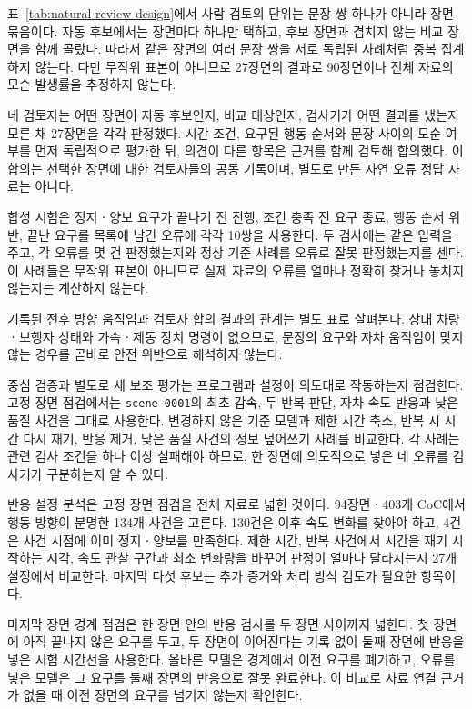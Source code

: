 표~\ref{tab:natural-review-design}에서 사람 검토의 단위는 문장 쌍 하나가 아니라 장면 묶음이다. 자동 후보에서는 장면마다 하나만 택하고, 후보 장면과 겹치지 않는 비교 장면을 함께 골랐다. 따라서 같은 장면의 여러 문장 쌍을 서로 독립된 사례처럼 중복 집계하지 않는다. 다만 무작위 표본이 아니므로 27장면의 결과로 90장면이나 전체 자료의 모순 발생률을 추정하지 않는다.

네 검토자는 어떤 장면이 자동 후보인지, 비교 대상인지, 검사기가 어떤 결과를 냈는지 모른 채 27장면을 각각 판정했다. 시간 조건, 요구된 행동 순서와 문장 사이의 모순 여부를 먼저 독립적으로 평가한 뒤, 의견이 다른 항목은 근거를 함께 검토해 합의했다. 이 합의는 선택한 장면에 대한 검토자들의 공동 기록이며, 별도로 만든 자연 오류 정답 자료는 아니다.

합성 시험은 정지ㆍ양보 요구가 끝나기 전 진행, 조건 충족 전 요구 종료, 행동 순서 위반, 끝난 요구를 목록에 남긴 오류에 각각 10쌍을 사용한다. 두 검사에는 같은 입력을 주고, 각 오류를 몇 건 판정했는지와 정상 기준 사례를 오류로 잘못 판정했는지를 센다. 이 사례들은 무작위 표본이 아니므로 실제 자료의 오류를 얼마나 정확히 찾거나 놓치지 않는지는 계산하지 않는다.

기록된 전후 방향 움직임과 검토자 합의 결과의 관계는 별도 표로 살펴본다. 상대 차량ㆍ보행자 상태와 가속ㆍ제동 장치 명령이 없으므로, 문장의 요구와 자차 움직임이 맞지 않는 경우를 곧바로 안전 위반으로 해석하지 않는다.

중심 검증과 별도로 세 보조 평가는 프로그램과 설정이 의도대로 작동하는지 점검한다. 고정 장면 점검에서는 \texttt{scene-0001}의 최초 감속, 두 반복 판단, 자차 속도 반응과 낮은 품질 사건을 그대로 사용한다. 변경하지 않은 기준 모델과 제한 시간 축소, 반복 시 시간 다시 재기, 반응 제거, 낮은 품질 사건의 정보 덮어쓰기 사례를 비교한다. 각 사례는 관련 검사 조건을 하나 이상 실패해야 하므로, 한 장면에 의도적으로 넣은 네 오류를 검사기가 구분하는지 알 수 있다.

반응 설정 분석은 고정 장면 점검을 전체 자료로 넓힌 것이다. 94장면ㆍ403개 CoC에서 행동 방향이 분명한 134개 사건을 고른다. 130건은 이후 속도 변화를 찾아야 하고, 4건은 사건 시점에 이미 정지ㆍ양보를 만족한다. 제한 시간, 반복 사건에서 시간을 재기 시작하는 시각, 속도 관찰 구간과 최소 변화량을 바꾸어 판정이 얼마나 달라지는지 27개 설정에서 비교한다. 마지막 다섯 후보는 추가 증거와 처리 방식 검토가 필요한 항목이다.

마지막 장면 경계 점검은 한 장면 안의 반응 검사를 두 장면 사이까지 넓힌다. 첫 장면에 아직 끝나지 않은 요구를 두고, 두 장면이 이어진다는 기록 없이 둘째 장면에 반응을 넣은 시험 시간선을 사용한다. 올바른 모델은 경계에서 이전 요구를 폐기하고, 오류를 넣은 모델은 그 요구를 둘째 장면의 반응으로 잘못 완료한다. 이 비교로 자료 연결 근거가 없을 때 이전 장면의 요구를 넘기지 않는지 확인한다.
